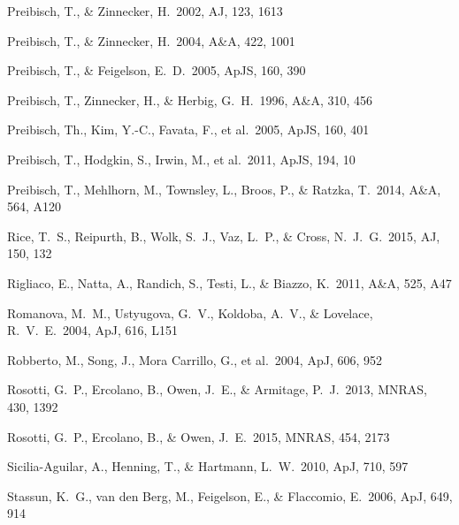 \documentclass[10pt,fleqn,twoside]{article}
\newcommand*\aap{A\&A}
\newcommand*\aj{AJ}
\newcommand*\apj{ApJ}
\newcommand*\apjl{ApJ}
\newcommand*\apjs{ApJS}
\newcommand*\mnras{MNRAS}
\begin{document}
\begin{thebibliography}{}
 Preibisch, T., \& Zinnecker, H.\ 2002, \aj, 123, 1613 

 Preibisch, T., \& Zinnecker, H.\ 2004, \aap, 422, 1001

 Preibisch, T., \& Feigelson, E.~D.\ 2005, \apjs, 160, 390

 Preibisch, T., Zinnecker, H., \& Herbig, G.~H.\ 1996, \aap, 310, 456

 Preibisch, Th., 
Kim, Y.-C., Favata, F., et al.\ 2005, \apjs, 160, 401


 Preibisch, T., Hodgkin, S., Irwin, M., et al.\ 2011, \apjs, 194, 10

 Preibisch, T., Mehlhorn, M., Townsley, L., Broos, P., \& Ratzka, T.\ 2014, \aap, 564, A120

 Rice, T.~S., Reipurth, B., Wolk, S.~J., Vaz, L.~P., \& Cross, N.~J.~G.\ 2015, \aj, 150, 132 

 Rigliaco, E., Natta, A., Randich, S., Testi, L., \& Biazzo, K.\ 2011, \aap, 525, A47

 Romanova, M.~M., Ustyugova, G.~V., Koldoba, A.~V., \& Lovelace, R.~V.~E.\ 2004, \apjl, 616, L151

 Robberto, M., Song, J., Mora Carrillo, G., et al.\ 2004, \apj, 606, 952 

 Rosotti, G.~P., Ercolano, B., Owen, J.~E., \& Armitage, P.~J.\ 2013, \mnras, 430, 1392

 Rosotti, G.~P., Ercolano, B., \& Owen, J.~E.\ 2015, \mnras, 454, 2173 


 Sicilia-Aguilar, A., Henning, T., \& Hartmann, L.~W.\ 2010, \apj, 710, 597 

 Stassun, K.~G., van den Berg, M., Feigelson, E., \& Flaccomio, E.\ 2006, \apj, 649, 914 


\end{thebibliography}
\end{document}
